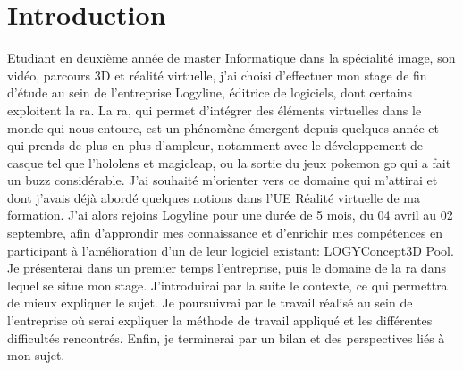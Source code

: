\section{Introduction}

Etudiant en deuxième année de master Informatique dans la spécialité image, son vidéo, parcours 3D et réalité virtuelle, j'ai choisi d'effectuer mon stage de fin d'étude au sein de l'entreprise Logyline, éditrice de logiciels, dont certains exploitent la \gls{ra}. La \gls{ra}, qui permet d'intégrer des éléments virtuelles dans le monde qui nous entoure, est un phénomène émergent depuis quelques année et qui prends de plus en plus d'ampleur, notamment avec le développement de casque tel que l'hololens et magicleap, ou la sortie du jeux pokemon go qui a fait un buzz considérable. J'ai souhaité m'orienter vers ce domaine qui m'attirai et dont j'avais déjà abordé quelques notions dans l'UE Réalité virtuelle de ma formation. J'ai alors rejoins Logyline pour une durée de 5 mois, du 04 avril au 02 septembre, afin d'approndir mes connaissance et d'enrichir mes compétences en participant à l'amélioration d'un de leur logiciel existant: LOGYConcept3D Pool.
\newline{}
Je présenterai dans un premier temps l'entreprise, puis le domaine de la \gls{ra} dans lequel se situe mon stage. J’introduirai par la suite le contexte, ce qui permettra de mieux expliquer le sujet. Je poursuivrai par le travail réalisé au sein de l’entreprise où serai expliquer la méthode de travail appliqué et les différentes difficultés rencontrés. Enfin, je terminerai par un bilan et des perspectives liés à mon sujet.
